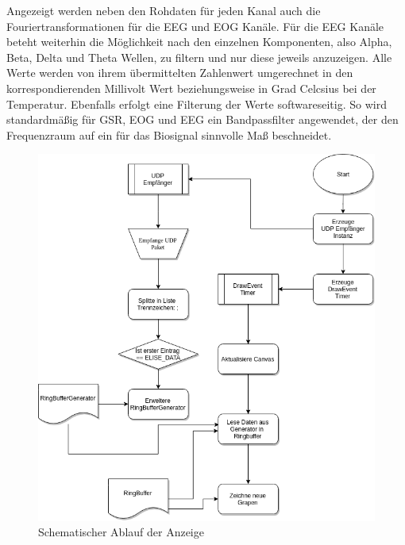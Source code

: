 Angezeigt werden neben den Rohdaten für jeden Kanal auch die Fouriertransformationen für die EEG und EOG Kanäle. Für die EEG Kanäle beteht weiterhin die Möglichkeit nach den einzelnen Komponenten, also Alpha, Beta, Delta und Theta Wellen, zu filtern und nur diese jeweils anzuzeigen. Alle Werte werden von ihrem übermittelten Zahlenwert umgerechnet in den korrespondierenden Millivolt Wert beziehungsweise in Grad Celcsius bei der Temperatur. Ebenfalls erfolgt eine Filterung der Werte softwareseitig. So wird standardmäßig für GSR, EOG und EEG ein Bandpassfilter angewendet, der den Frequenzraum auf ein für das Biosignal sinnvolle Maß beschneidet. 

\begin{figure}[h]
    \centering
\begin{minipage}[t]{0.9\textwidth}
\includegraphics[width=\textwidth]{Images/ablauf_anzeige.png}
\end{minipage}
    \caption{Schematischer Ablauf der Anzeige}
    \label{fig:schema_anzeige}
\end{figure}


